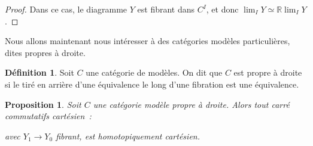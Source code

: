 \documentclass{amsart}
\theoremstyle{plain}
\newtheorem{prop}[theo]{Proposition}
\theoremstyle{definition}
\newtheorem{defi}[theo]{Définition}
\theoremstyle{remark}
\newcommand{\ra}{\rightarrow}
\begin{document}
\begin{proof}
  Dans ce cas, le diagramme $Y$ est fibrant dans $C^I$, et donc $\lim_I Y\simeq \mathbb{R}\lim_I Y$.
\end{proof}

Nous allons maintenant nous intéresser à des catégories modèles particulières, dites propres à droite.

\begin{defi}
  Soit $C$ une catégorie de modèles. On dit que $C$ est propre à droite si le tiré en arrière d'une équivalence le long
  d'une fibration est une équivalence.
\end{defi}

\begin{prop}\label{criterehomocartesienpropreadroite}
  Soit $C$ une catégorie modèle propre à droite. Alors tout carré commutatifs cartésien~:
  \begin{center}
  \end{center}
  avec $Y_1\ra Y_0$ fibrant, est homotopiquement cartésien.
\end{prop}
\end{document}

